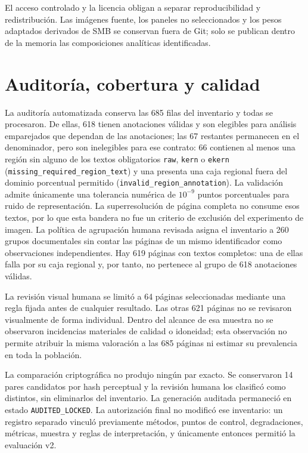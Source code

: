 El acceso controlado y la licencia obligan a separar reproducibilidad y redistribución. Las imágenes
fuente, los paneles no seleccionados y los pesos adaptados derivados de SMB se conservan fuera de
Git; solo se publican dentro de la memoria las composiciones analíticas identificadas.

\section{Auditoría, cobertura y calidad}
La auditoría automatizada conserva las 685 filas del inventario y todas se procesaron. De ellas,
618 tienen anotaciones válidas y son elegibles para análisis emparejados que dependan
de las anotaciones; las 67 restantes permanecen en el denominador, pero son inelegibles para ese
contrato: 66 contienen al menos una región sin alguno de los textos obligatorios
\texttt{raw}, \texttt{kern} o \texttt{ekern}
(\texttt{missing\_required\_region\_text}) y una presenta una caja regional fuera del dominio
porcentual permitido (\texttt{invalid\_region\_}\allowbreak\texttt{annotation}). La validación admite únicamente una
tolerancia numérica de \(10^{-9}\) puntos porcentuales para ruido de representación. La
superresolución de página completa no consume esos textos, por lo que esta bandera no fue un
criterio de exclusión del experimento de imagen. La política de agrupación humana revisada asigna
el inventario a 260 grupos documentales sin contar las páginas de un mismo identificador como
observaciones independientes. Hay 619 páginas con textos completos: una de ellas falla por su caja
regional y, por tanto, no pertenece al grupo de 618 anotaciones válidas.

La revisión visual humana se limitó a 64 páginas seleccionadas mediante una regla fijada antes de
cualquier resultado. Las otras 621 páginas no se revisaron visualmente de forma individual. Dentro
del alcance de esa muestra no se observaron incidencias materiales de calidad o idoneidad; esta
observación no permite atribuir la misma valoración a las 685 páginas ni estimar su prevalencia en
toda la población.

La comparación criptográfica no produjo ningún par exacto. Se conservaron 14 pares candidatos por
hash perceptual y la revisión humana los clasificó como distintos, sin eliminarlos del inventario.
La generación auditada permaneció en estado \texttt{AUDITED\_LOCKED}. La autorización final no
modificó ese inventario: un registro separado vinculó previamente métodos, puntos de control,
degradaciones, métricas, muestra y reglas de interpretación, y únicamente entonces permitió la
evaluación v2.

